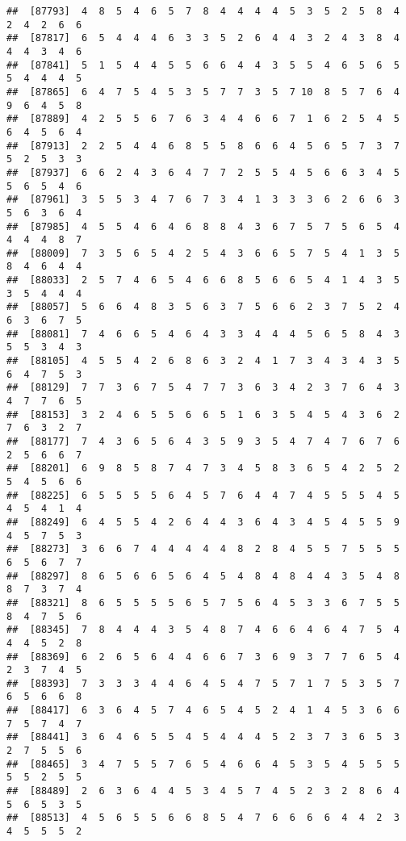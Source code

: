 \documentclass[
]{book}
\begin{document}
\begin{verbatim}
##  [87793]  4  8  5  4  6  5  7  8  4  4  4  4  5  3  5  2  5  8  4  2  4  2  6  6
##  [87817]  6  5  4  4  4  6  3  3  5  2  6  4  4  3  2  4  3  8  4  4  4  3  4  6
##  [87841]  5  1  5  4  4  5  5  6  6  4  4  3  5  5  4  6  5  6  5  5  4  4  4  5
##  [87865]  6  4  7  5  4  5  3  5  7  7  3  5  7 10  8  5  7  6  4  9  6  4  5  8
##  [87889]  4  2  5  5  6  7  6  3  4  4  6  6  7  1  6  2  5  4  5  6  4  5  6  4
##  [87913]  2  2  5  4  4  6  8  5  5  8  6  6  4  5  6  5  7  3  7  5  2  5  3  3
##  [87937]  6  6  2  4  3  6  4  7  7  2  5  5  4  5  6  6  3  4  5  5  6  5  4  6
##  [87961]  3  5  5  3  4  7  6  7  3  4  1  3  3  3  6  2  6  6  3  5  6  3  6  4
##  [87985]  4  5  5  4  6  4  6  8  8  4  3  6  7  5  7  5  6  5  4  4  4  4  8  7
##  [88009]  7  3  5  6  5  4  2  5  4  3  6  6  5  7  5  4  1  3  5  8  4  6  4  4
##  [88033]  2  5  7  4  6  5  4  6  6  8  5  6  6  5  4  1  4  3  5  3  5  4  4  4
##  [88057]  5  6  6  4  8  3  5  6  3  7  5  6  6  2  3  7  5  2  4  6  3  6  7  5
##  [88081]  7  4  6  6  5  4  6  4  3  3  4  4  4  5  6  5  8  4  3  5  5  3  4  3
##  [88105]  4  5  5  4  2  6  8  6  3  2  4  1  7  3  4  3  4  3  5  6  4  7  5  3
##  [88129]  7  7  3  6  7  5  4  7  7  3  6  3  4  2  3  7  6  4  3  4  7  7  6  5
##  [88153]  3  2  4  6  5  5  6  6  5  1  6  3  5  4  5  4  3  6  2  7  6  3  2  7
##  [88177]  7  4  3  6  5  6  4  3  5  9  3  5  4  7  4  7  6  7  6  2  5  6  6  7
##  [88201]  6  9  8  5  8  7  4  7  3  4  5  8  3  6  5  4  2  5  2  5  4  5  6  6
##  [88225]  6  5  5  5  5  6  4  5  7  6  4  4  7  4  5  5  5  4  5  4  5  4  1  4
##  [88249]  6  4  5  5  4  2  6  4  4  3  6  4  3  4  5  4  5  5  9  4  5  7  5  3
##  [88273]  3  6  6  7  4  4  4  4  4  8  2  8  4  5  5  7  5  5  5  6  5  6  7  7
##  [88297]  8  6  5  6  6  5  6  4  5  4  8  4  8  4  4  3  5  4  8  8  7  3  7  4
##  [88321]  8  6  5  5  5  5  6  5  7  5  6  4  5  3  3  6  7  5  5  8  4  7  5  6
##  [88345]  7  8  4  4  4  3  5  4  8  7  4  6  6  4  6  4  7  5  4  4  4  5  2  8
##  [88369]  6  2  6  5  6  4  4  6  6  7  3  6  9  3  7  7  6  5  4  2  3  7  4  5
##  [88393]  7  3  3  3  4  4  6  4  5  4  7  5  7  1  7  5  3  5  7  6  5  6  6  8
##  [88417]  6  3  6  4  5  7  4  6  5  4  5  2  4  1  4  5  3  6  6  7  5  7  4  7
##  [88441]  3  6  4  6  5  5  4  5  4  4  4  5  2  3  7  3  6  5  3  2  7  5  5  6
##  [88465]  3  4  7  5  5  7  6  5  4  6  6  4  5  3  5  4  5  5  5  5  5  2  5  5
##  [88489]  2  6  3  6  4  4  5  3  4  5  7  4  5  2  3  2  8  6  4  5  6  5  3  5
##  [88513]  4  5  6  5  5  6  6  8  5  4  7  6  6  6  6  4  4  2  3  4  5  5  5  2

\end{verbatim}
\end{document}
